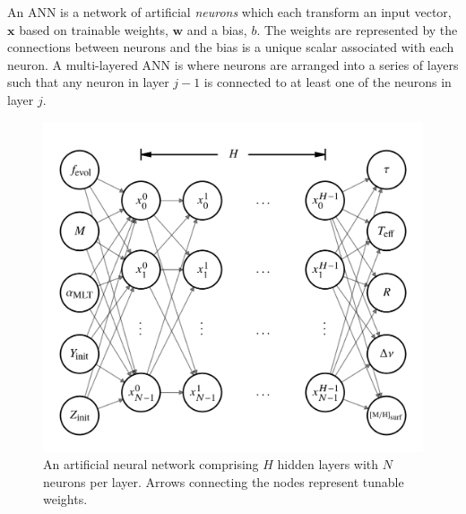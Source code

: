 An ANN is a network of artificial \emph{neurons} which each transform an input vector, $\boldsymbol{x}$ based on trainable weights, $\boldsymbol{w}$ and a bias, $b$. The weights are represented by the connections between neurons and the bias is a unique scalar associated with each neuron. A multi-layered ANN is where neurons are arranged into a series of layers such that any neuron in layer $j-1$ is connected to at least one of the neurons in layer $j$. 

\begin{figure}
    \centering
    \includegraphics{figures/network_10.png}
    \caption[An artificial neural network comprising $H$ hidden layers with $N$ neurons per layer.]{An artificial neural network comprising $H$ hidden layers with $N$ neurons per layer. Arrows connecting the nodes represent tunable weights.}
    \label{fig:net}
\end{figure}

